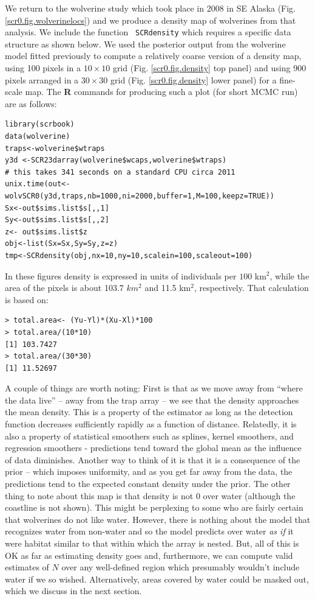We return to the wolverine study which took place in 2008 in SE Alaska
(Fig. \ref{scr0.fig.wolverinelocs}) and we produce a density map of
wolverines from that analysis. We include the function \mbox{\tt
  SCRdensity} which requires a specific data structure as shown
below.
We used the posterior output from the wolverine model fitted previously
to compute a relatively coarse version of a density map, using 100
pixels in a $10 \times
10$ grid (Fig. \ref{scr0.fig.density} top panel) and using 900 pixels
arranged in
 a $30 \times 30$
grid (Fig. \ref{scr0.fig.density} lower panel) for a fine-scale map. The {\bf R} commands for
producing such a plot (for short MCMC run) are as follows:
{\small
\begin{verbatim}
library(scrbook)
data(wolverine)
traps<-wolverine$wtraps
y3d <-SCR23darray(wolverine$wcaps,wolverine$wtraps)
# this takes 341 seconds on a standard CPU circa 2011
unix.time(out<-wolvSCR0(y3d,traps,nb=1000,ni=2000,buffer=1,M=100,keepz=TRUE))
Sx<-out$sims.list$s[,,1]
Sy<-out$sims.list$s[,,2]
z<- out$sims.list$z
obj<-list(Sx=Sx,Sy=Sy,z=z)
tmp<-SCRdensity(obj,nx=10,ny=10,scalein=100,scaleout=100)
\end{verbatim}
In these figures density is
expressed in units of individuals per $100$ km$^2$, while the area of
the pixels is about 103.7 $km^2$ and 11.5 km$^2$, respectively. That
calculation is based on:
\begin{verbatim}
> total.area<- (Yu-Yl)*(Xu-Xl)*100
> total.area/(10*10)
[1] 103.7427
> total.area/(30*30)
[1] 11.52697
\end{verbatim}

A couple of things are worth noting: First is that as we move away
from ``where the data live'' -- away from the trap array -- we see that
the density approaches the mean density. This is a property of the
estimator as long as the detection function decreases sufficiently
rapidly as a function of distance.  Relatedly, it is also a property
of statistical smoothers such as splines, kernel smoothers, and
regression smoothers - predictions tend toward the global mean as the
influence of data diminishes.
 Another way to think of it is that it is
a consequence of the prior -- which imposes uniformity, and as you get
far away from the data, the predictions tend to the expected constant
density under the prior.  The other thing to note about this map is
that density is not $0$ over water (although the coastline is not
shown). This might be perplexing to some who are fairly certain that
wolverines do not like water. However, there is nothing about the
model that recognizes water from non-water and so the model predicts
over water {\it as if} it were habitat similar to that within which
the array is nested. But, all of this is OK as far as estimating
density goes and, furthermore, we can compute valid estimates of $N$
over any well-defined region which presumably wouldn't include water
if we so wished. Alternatively, areas covered by water could be masked
out, which we discuss in the next section.

}
